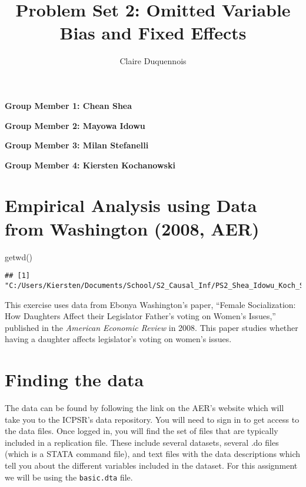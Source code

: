 \documentclass[
]{article}
\title{Problem Set 2: Omitted Variable Bias and Fixed Effects}
\author{Claire Duquennois}
\date{}
\newenvironment{Shaded}{\begin{snugshade}}{\end{snugshade}}
\newcommand{\FunctionTok}[1]{\textcolor[rgb]{0.00,0.00,0.00}{#1}}
\newcommand{\NormalTok}[1]{#1}
\begin{document}
\maketitle

\textbf{Group Member 1: Chean Shea}

\textbf{Group Member 2: Mayowa Idowu}

\textbf{Group Member 3: Milan Stefanelli}

\textbf{Group Member 4: Kiersten Kochanowski}

\hypertarget{empirical-analysis-using-data-from-washington-2008-aer}{%
\section{Empirical Analysis using Data from Washington (2008,
AER)}\label{empirical-analysis-using-data-from-washington-2008-aer}}

\begin{Shaded}
\begin{Highlighting}[]
\FunctionTok{getwd}\NormalTok{()}
\end{Highlighting}
\end{Shaded}

\begin{verbatim}
## [1] "C:/Users/Kiersten/Documents/School/S2_Causal_Inf/PS2_Shea_Idowu_Koch_Stefanelli"
\end{verbatim}

This exercise uses data from Ebonya Washington's paper, ``Female
Socialization: How Daughters Affect their Legislator Father's voting on
Women's Issues,'' published in the \emph{American Economic Review} in
2008. This paper studies whether having a daughter affects legislator's
voting on women's issues.

\hypertarget{finding-the-data}{%
\section{Finding the data}\label{finding-the-data}}

The data can be found by following the link on the AER's website which
will take you to the ICPSR's data repository. You will need to sign in
to get access to the data files. Once logged in, you will find the set
of files that are typically included in a replication file. These
include several datasets, several .do files (which is a STATA command
file), and text files with the data descriptions which tell you about
the different variables included in the dataset. For this assignment we
will be using the \texttt{basic.dta} file.
\end{document}
